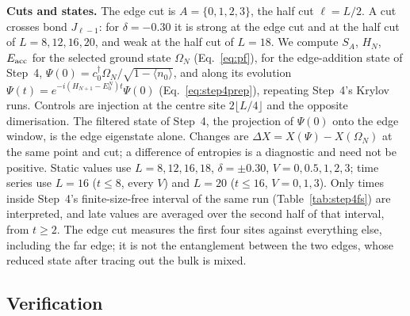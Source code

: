 \documentclass[11pt,a4paper]{article}
\newcommand{\dg}{^{\dagger}}
\begin{document}
\textbf{Cuts and states.}
The edge cut is $A=\{0,1,2,3\}$, the half cut $\ell=L/2$.
A cut crosses bond $J_{\ell-1}$: for $\delta=-0.30$ it is strong at the edge cut and at the half cut of $L=8,12,16,20$, and weak at the half cut of $L=18$.
We compute $S_A$, $H_N$, $E_{\rm acc}$ for the selected ground state $\Omega_N$ (Eq.~\eqref{eq:pf}), for the edge-addition state of Step~4, $\Psi(0)=c_0\dg\Omega_N/\sqrt{1-\langle n_0\rangle}$, and along its evolution $\Psi(t)=e^{-i(H_{N+1}-E_0^N)t}\Psi(0)$ (Eq.~\eqref{eq:step4prep}), repeating Step~4's Krylov runs.
Controls are injection at the centre site $2\lfloor L/4\rfloor$ and the opposite dimerisation.
The filtered state of Step~4, the projection of $\Psi(0)$ onto the edge window, is the edge eigenstate alone.
Changes are $\Delta X=X(\Psi)-X(\Omega_N)$ at the same point and cut; a difference of entropies is a diagnostic and need not be positive.
Static values use $L=8,12,16,18$, $\delta=\pm0.30$, $V=0,0.5,1,2,3$; time series use $L=16$ ($t\le8$, every $V$) and $L=20$ ($t\le16$, $V=0,1,3$).
Only times inside Step~4's finite-size-free interval of the same run (Table~\ref{tab:step4fs}) are interpreted, and late values are averaged over the second half of that interval, from $t\ge2$.
The edge cut measures the first four sites against everything else, including the far edge; it is not the entanglement between the two edges, whose reduced state after tracing out the bulk is mixed.

\subsection{Verification}
\end{document}
